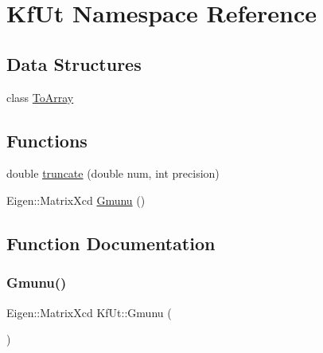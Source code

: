 \hypertarget{namespaceKfUt}{}\section{Kf\+Ut Namespace Reference}
\label{namespaceKfUt}
\subsection*{Data Structures}
\begin{DoxyCompactItemize}
\item 
class \mbox{\hyperlink{classKfUt_1_1ToArray}{To\+Array}}
\end{DoxyCompactItemize}
\subsection*{Functions}
\begin{DoxyCompactItemize}
\item 
double \mbox{\hyperlink{namespaceKfUt_a155e8db38d770e216ef19d9938394c17}{truncate}} (double num, int precision)
\item 
Eigen\+::\+Matrix\+Xcd \mbox{\hyperlink{namespaceKfUt_ac090f8c3b57fe35c462bd3c3c2d8f08b}{Gmunu}} ()
\end{DoxyCompactItemize}


\subsection{Function Documentation}
\mbox{\label{namespaceKfUt_ac090f8c3b57fe35c462bd3c3c2d8f08b}} 
\subsubsection{\texorpdfstring{Gmunu()}{Gmunu()}}
{\footnotesize\ttfamily Eigen\+::\+Matrix\+Xcd Kf\+Ut\+::\+Gmunu (\begin{DoxyParamCaption}{ }\end{DoxyParamCaption})}

